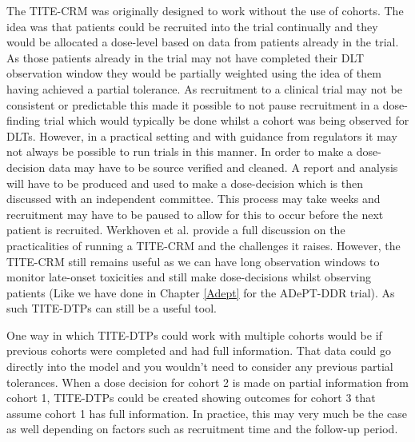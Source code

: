 The TITE-CRM was originally designed to work without the use of cohorts. The idea was that patients could be recruited into the trial continually and they would be allocated a dose-level based on data from patients already in the trial. As those patients already in the trial may not have completed their DLT observation window they would be partially weighted using the idea of them having achieved a partial tolerance. As recruitment to a clinical trial may not be consistent or predictable this made it possible to not pause recruitment in a dose-finding trial which would typically be done whilst a cohort was being observed for DLTs. However, in a practical setting and with guidance from regulators it may not always be possible to run trials in this manner. In order to make a dose-decision data may have to be source verified and cleaned. A report and analysis will have to be produced and  used to make a dose-decision which is then discussed with an independent committee. This process may take weeks and recruitment may have to be paused to allow for this to occur before the next patient is recruited. Werkhoven et al. \cite{vanwerkhovenPracticalitiesRunningEarlyphase2020} provide a full discussion on the practicalities of running a TITE-CRM and the challenges it raises. However, the TITE-CRM still remains useful as we can have long observation windows to monitor late-onset toxicities and still make dose-decisions whilst observing patients (Like we have done in Chapter \ref{Adept} for the ADePT-DDR trial). As such TITE-DTPs can still be a useful tool.

One way in which TITE-DTPs could work with multiple cohorts would be if previous cohorts were completed and had full information. That data could go directly into the model and you wouldn't need to consider any previous partial tolerances. When a dose decision for cohort 2 is made on partial information from cohort 1, TITE-DTPs could be created showing outcomes for cohort 3 that assume cohort 1 has full information. In practice, this may very much be the case as well depending on factors such as recruitment time and the follow-up period. 

